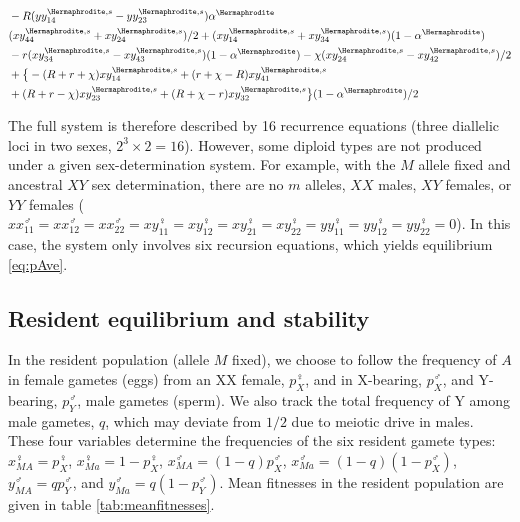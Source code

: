 \documentclass[12pt]{article}
\begin{document}
\begin{subequations}
\begin{align}
\begin{split}
&-R(yy_{14}^{\Hermaphrodite,s}-yy_{23}^{\Hermaphrodite,s}) \alpha^\Hermaphrodite\\
&(xy_{44}^{\Hermaphrodite,s}+xy_{24}^{\Hermaphrodite,s})/2+(xy_{14}^{\Hermaphrodite,s}+xy_{34}^{\Hermaphrodite,s})(1-\alpha^\Hermaphrodite)\\
&- r(xy_{34}^{\Hermaphrodite,s}-xy_{43}^{\Hermaphrodite,s})(1-\alpha^\Hermaphrodite) - \chi(xy_{24}^{\Hermaphrodite,s}-xy_{42}^{\Hermaphrodite,s})/2\\
&+\big{\{}-(R+r+\chi) xy_{14}^{\Hermaphrodite,s} + (r+\chi-R)xy_{41}^{\Hermaphrodite,s}\\
&+(R+r-\chi) xy_{23}^{\Hermaphrodite,s} + (R+\chi-r) xy_{32}^{\Hermaphrodite,s}\big{\}}(1-\alpha^\Hermaphrodite)/2
\end{split}
\end{align}
\label{eq:recursions}
\end{subequations}

\endgroup

\noindent
The full system is therefore described by 16 recurrence equations (three diallelic loci in two sexes, $2^3 \times 2 = 16$). 
However, some diploid types are not produced under a given sex-determination system. 
For example, with the $M$ allele fixed and ancestral $XY$ sex determination, there are no $m$ alleles, $XX$ males, $XY$ females, or $YY$ females ($xx_{11}^{\male}=xx_{12}^{\male}=xx_{22}^\male=xy_{11}^{\female}=xy_{12}^{\female}=xy_{21}^{\female}=xy_{22}^\female=yy_{11}^{\female}=yy_{12}^{\female}=yy_{22}^\female=0$). 
In this case, the system only involves six recursion equations, %
which yields equilibrium \eqref{eq:pAve}. 


\subsection*{Resident equilibrium and stability}

In the resident population (allele $M$ fixed), we choose to follow the frequency of $A$ in female gametes (eggs) from an XX female, $p^\female_X$, and in X-bearing, $p^\male_X$, and Y-bearing, $p^\male_Y$, male gametes (sperm).
We also track the total frequency of Y among male gametes, $q$, which may deviate from $1/2$ due to meiotic drive in males. 
These four variables determine the frequencies of the six resident gamete types: $x_{MA}^{\female}=p_{X}^{\female}$, $x_{Ma}^{\female}=1-p_{X}^{\female}$, $x_{MA}^{\male}=(1-q)p_{X}^{\male}$, $x_{Ma}^{\male}=(1-q)(1-p_{X}^{\male})$, $y_{MA}^{\male}=q p_{Y}^{\male}$, and $y_{Ma}^{\male}=q(1-p_{Y}^{\male})$. 
Mean fitnesses in the resident population are given in table \ref{tab:meanfitnesses}.
\end{document}
